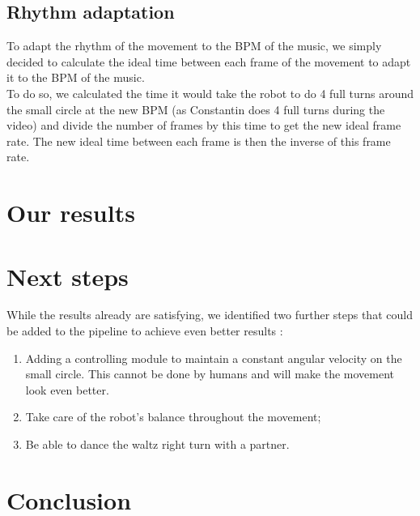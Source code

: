 \documentclass{amsart}
\theoremstyle{definition}
\theoremstyle{plain}
\begin{document}
\subsection{Rhythm adaptation}

To adapt the rhythm of the movement to the BPM of the music, we simply decided to calculate the ideal time between each frame of the movement to adapt it to the BPM of the music. \\

To do so, we calculated the time it would take the robot to do 4 full turns around the small circle at the new BPM (as Constantin does 4 full turns during the video) and divide the number of frames by this time to get the new ideal frame rate. The new ideal time between each frame is then the inverse of this frame rate.\\

\section{Our results}


\section{Next steps}


While the results already are satisfying, we identified two further steps that could be added to the pipeline to achieve even better results :
\begin{enumerate}
    \item Adding a controlling module to maintain a constant angular velocity on the small circle. This cannot be done by humans and will make the movement look even better.
    \item Take care of the robot's balance throughout the movement;
    \item Be able to dance the waltz right turn with a partner.
\end{enumerate}

\section{Conclusion}


\printbibliography[]
\end{document}
